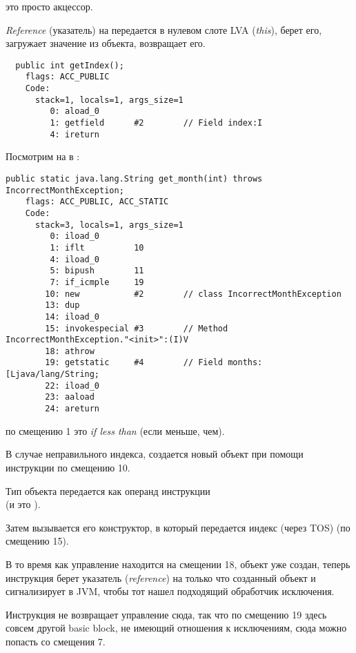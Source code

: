  это просто акцессор.

\emph{Reference} (указатель) на  передается в нулевом слоте \ac{LVA}
(\emph{this}),  берет его,  загружает значение из объекта, 
 возвращает его.

\begin{lstlisting}
  public int getIndex();
    flags: ACC_PUBLIC
    Code:
      stack=1, locals=1, args_size=1
         0: aload_0       
         1: getfield      #2        // Field index:I
         4: ireturn       
\end{lstlisting}

Посмотрим на  в :

\begin{lstlisting}[caption=Month2.class]
  public static java.lang.String get_month(int) throws IncorrectMonthException;
    flags: ACC_PUBLIC, ACC_STATIC
    Code:
      stack=3, locals=1, args_size=1
         0: iload_0       
         1: iflt          10
         4: iload_0       
         5: bipush        11
         7: if_icmple     19
        10: new           #2        // class IncorrectMonthException
        13: dup           
        14: iload_0       
        15: invokespecial #3        // Method IncorrectMonthException."<init>":(I)V
        18: athrow        
        19: getstatic     #4        // Field months:[Ljava/lang/String;
        22: iload_0       
        23: aaload        
        24: areturn       
\end{lstlisting}

 по смещению 1 это \emph{if less than} (если меньше, чем).

В случае неправильного индекса, создается новый объект при помощи инструкции  
по смещению 10.

Тип объекта передается как операнд инструкции\\
(и это ).

Затем вызывается его конструктор, в который передается индекс (через \ac{TOS}) (по смещению 15).

В то время как управление находится на смещении 18, объект уже создан,
теперь инструкция  берет указатель (\emph{reference})
на только что созданный объект и сигнализирует в \ac{JVM}, чтобы тот нашел подходящий обработчик
исключения.

Инструкция  не возвращает управление сюда,
так что по смещению 19 здесь совсем другой \gls{basic block},
не имеющий отношения к исключениям, сюда можно попасть со смещения 7.

